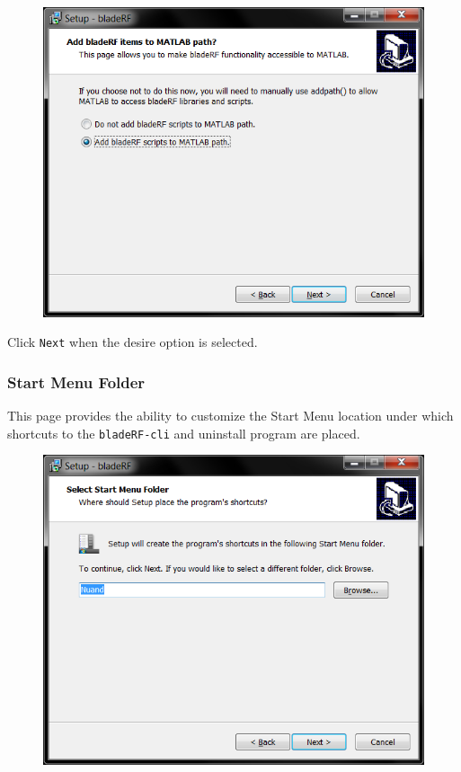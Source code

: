 {\begin{figure}[h]
  \centering
  \includegraphics{images/windows/installer/05-matlabpath.png}
\end{figure}

Click \texttt{Next} when the desire option is selected.

\newpage
\subsubsection{Start Menu Folder}

This page provides the ability to customize the Start Menu location
under which shortcuts to the \texttt{bladeRF-cli} and uninstall program
are placed.

\begin{figure}[h]
  \centering
  \includegraphics{images/windows/installer/06-startmenu.png}
\end{figure}

}
